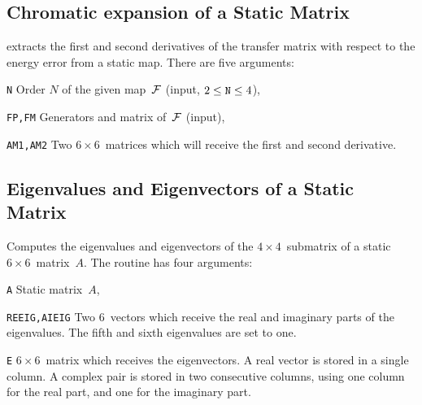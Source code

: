 \subsection{Chromatic expansion of a Static Matrix}
\label{LACHRM}
extracts the first and second derivatives of the transfer matrix with
respect to the energy error from a static map.
There are five arguments:
\begin{mylist}
\item[\tt N]
Order $N$ of the given map~$\cal F$ (input, $2 \le \hbox{\tt N} \le 4$),
\item[\tt FP,FM]
Generators and matrix of~$\cal F$ (input),
\item[\tt AM1,AM2]
Two $6 \times 6$~matrices which will receive the first and second
derivative.
\end{mylist}
 
\subsection{Eigenvalues and Eigenvectors of a Static Matrix}
\label{LASEIG}
Computes the eigenvalues and eigenvectors
of the $4 \times 4$~submatrix of a static $6 \times 6$~matrix~$A$.
The routine has four arguments:
\begin{mylist}
\item[\tt A]
Static matrix~$A$,
\item[\tt REEIG,AIEIG]
Two $6$~vectors which receive the real and imaginary parts of the
eigenvalues.
The fifth and sixth eigenvalues are set to one.
\item[\tt E]
$6 \times 6$~matrix which receives the eigenvectors.
A real vector is stored in a single column.
A complex pair is stored in two consecutive columns,
using one column for the real part, and one for the imaginary part.
\end{mylist}
 
